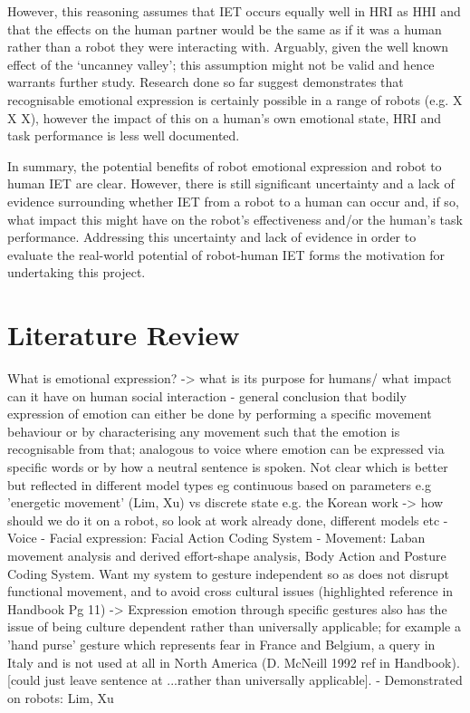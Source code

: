 \documentclass[]{article}
\begin{document}
However, this reasoning assumes that IET occurs equally well in HRI as HHI and that the effects on the human partner would be the same as if it was a human rather than a robot they were interacting with. Arguably, given the well known effect of the `uncanney valley'; this assumption might not be valid and hence warrants further study. Research done so far suggest demonstrates that recognisable emotional expression is certainly possible in a range of robots (e.g. X X X), however the impact of this on a human's own emotional state, HRI and task performance is less well documented. 


In summary, the potential benefits of robot emotional expression and robot to human IET are clear. However, there is still significant uncertainty and a lack of evidence surrounding whether IET from a robot to a human can occur  and, if so, what impact this might have on the robot's effectiveness and/or the human's task performance. Addressing this uncertainty and lack of evidence in order to evaluate the real-world potential of robot-human IET forms the motivation for undertaking this project. 

\section{Literature Review}

What is emotional expression?
-> what is its purpose for humans/ what impact can it have on human social interaction
- general conclusion that bodily expression of emotion can either be done by performing a specific movement behaviour or by characterising any movement such that the emotion is recognisable from that; analogous to voice where emotion can be expressed via specific words or by how a neutral sentence is spoken. Not clear which is better but reflected in different model types eg continuous based on parameters e.g 'energetic movement' (Lim, Xu) vs discrete state e.g. the Korean work 
-> how should we do it on a robot, so look at work already done, different models etc
- Voice
- Facial expression: Facial Action Coding System
- Movement: Laban movement analysis and derived effort-shape analysis, Body Action and Posture Coding System. Want my system to gesture independent so as does not disrupt functional movement, and to avoid cross cultural issues (highlighted reference in Handbook Pg 11)
-> Expression emotion through specific gestures also has the issue of being culture dependent rather than universally applicable; for example a 'hand purse' gesture which represents fear in France and Belgium, a query in Italy and is not used at all in North America (D. McNeill 1992 ref in Handbook). [could just leave sentence at ...rather than universally applicable].  
- Demonstrated on robots: Lim, Xu
\end{document}
